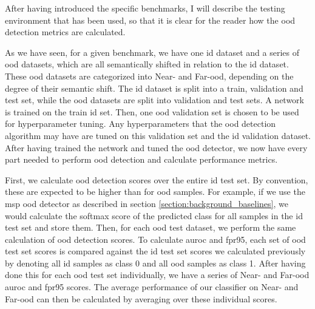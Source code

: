 \documentclass[UKenglish]{uiomasterthesis} %
\theoremstyle{definition}
\begin{document}
After having introduced the specific benchmarks, I will describe the testing environment that has been used, so that it is clear for the reader how the \ac{ood} detection metrics are calculated.

As we have seen, for a given benchmark, we have one \ac{id} dataset and a series of \ac{ood} datasets, which are all semantically shifted in relation to the \ac{id} dataset. These \ac{ood} datasets are categorized into Near- and Far-\ac{ood}, depending on the degree of their semantic shift. The \ac{id} dataset is split into a train, validation and test set, while the \ac{ood} datasets are split into validation and test sets. A network is trained on the train \ac{id} set.  Then, one \ac{ood} validation set is chosen to be used for hyperparameter tuning. Any hyperparameters that the \ac{ood} detection algorithm may have are tuned on this validation set and the \ac{id} validation dataset. After having trained the network and tuned the \ac{ood} detector, we now have every part needed to perform \ac{ood} detection and calculate performance metrics.

First, we calculate \ac{ood} detection scores over the entire \ac{id} test set. By convention, these are expected to be higher than for \ac{ood} samples. For example, if we use the \ac{msp} \ac{ood} detector as described in section \ref{section:background_baselines}, we would calculate the softmax score of the predicted class for all samples in the \ac{id} test set and store them. Then, for each \ac{ood} test dataset, we perform the same calculation of \ac{ood} detection scores. To calculate \ac{auroc} and \ac{fpr95}, each set of \ac{ood} test set scores is compared against the \ac{id} test set scores we calculated previously by denoting all \ac{id} samples as class 0 and all \ac{ood} samples as class 1. After having done this for each \ac{ood} test set individually, we have a series of Near- and Far-\ac{ood} \ac{auroc} and \ac{fpr95} scores. The average performance of our classifier on Near- and Far-\ac{ood} can then be calculated by averaging over these individual scores. %

\end{document}
